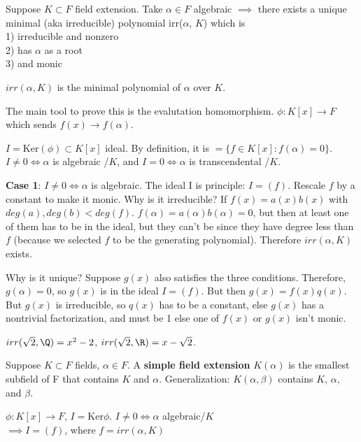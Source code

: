 \documentclass[10pt]{article}
\newcommand{\Ker}{\text{Ker}}
\begin{document}
\begin{lem}
    Suppose $K \subset F$ field extension. Take $\alpha \in F$ algebraic $\implies$ there exists a unique minimal (aka irreducible) polynomial irr($\alpha$, $K$) which is \\
    1) irreducible and nonzero \\
    2) has $\alpha$ as a root \\
    3) and monic 
\end{lem}
$irr(\alpha, K)$ is the minimal polynomial of $\alpha$ over $K$.

The main tool to prove this is the evalutation homomorphism. $\phi: K[x] \to F$ which sends $f(x) \to f(\alpha)$.

$I = \Ker(\phi) \subset K[x]$ ideal. By definition, it is $= \{ f\in K[x] : f(\alpha) = 0\}$. $I \neq 0 \iff \alpha$ is algebraic /$K$, and $I = 0 \iff \alpha$ is transcendental /$K$.

\textbf{Case 1}: $I \neq 0 \iff \alpha$ is algebraic.
The ideal I is principle: $I = (f)$. Rescale $f$ by a constant to make it monic. Why is it irreducible? If $f(x) = a(x)b(x)$ with $deg (a), deg(b) < deg(f)$. $f(\alpha) = a(\alpha)b(\alpha) = 0$, but then at least one of them has to be in the ideal, but they can't be since they have degree less than $f$ (because we selected $f$ to be the generating polynomial). Therefore $irr(\alpha, K)$ exists.

Why is it unique? Suppose $g(x)$ also satisfies the three conditions. Therefore, $g(\alpha) = 0$, so $g(x)$ is in the ideal $I = (f)$. But then $g(x) = f(x)q(x)$. But $g(x)$ is irreducible, so $q(x)$ has to be a constant, else $g(x)$ has a nontrivial factorization, and must be 1 else one of $f(x)$ or $g(x)$ isn't monic.

\begin{exm*}
    $irr(\sqrt{2}, \Q) = x^2 - 2$, $irr(\sqrt{2}, \R) = x - \sqrt2$.
\end{exm*}

\begin{defn}
    Suppose $K \subset F$ fields, $\alpha \in F$. A \textbf{simple field extension} $K(\alpha)$ is the smallest subfield of F that contains $K$ and $\alpha$. Generalization: $K(\alpha, \beta)$ contains $K$, $\alpha$, and $\beta$.
\end{defn}

$\phi : K[x] \to F$, $I = \Ker\phi$. $I \neq 0 \iff \alpha$ algebraic/$K$\\
$\implies I = (f)$, where $f = irr(\alpha, K)$
\end{document}
